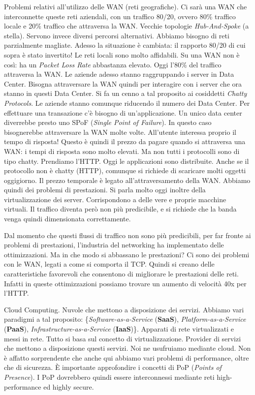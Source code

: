 Problemi relativi all'utilizzo delle WAN (reti geografiche). Ci sarà una WAN che interconnette queste reti aziendali, con un traffico 80/20, ovvero 80\% traffico locale e 20\% traffico che attraversa la WAN. Vecchie topologie \textit{Hub-And-Spoke} (a stella). Servono invece diversi percorsi alternativi. Abbiamo bisogno di reti parzialmente magliate. Adesso la situazione è cambiata: il rapporto 80/20 di cui sopra è stato invertito! Le reti locali sono molto affidabili. Su una WAN non è così: ha un \textit{Packet Loss Rate} abbastanza elevato. Oggi l'80\% del traffico attraversa la WAN. Le aziende adesso stanno raggruppando i server in Data Center. Bisogna attraversare la WAN quindi per interagire con i server che ora stanno in questi Data Center. Si fa un cenno a tal proposito ai cosiddetti \textit{Chatty Protocols}.
Le aziende stanno comunque riducendo il numero dei Data Center. Per effettuare una transazione c'è bisogno di un'applicazione. Un unico data center diverrebbe presto uno SPoF (\textit{Single Point of Failure}). In questo caso bisognerebbe attraversare la WAN molte volte. All'utente interessa proprio il tempo di risposta! Questo è quindi il prezzo da pagare quando si attraversa una WAN: i tempi di risposta sono molto elevati. Ma non tutti i protocolli sono di tipo chatty. Prendiamo l'HTTP. Oggi le applicazioni sono distribuite. Anche se il protocollo non è chatty (HTTP), comunque si richiede di scaricare molti oggetti oggigiorno. Il prezzo temporale è legato all'attraversamento della WAN. Abbiamo quindi dei problemi di prestazioni. Si parla molto oggi inoltre della virtualizzazione dei server. Corrispondono a delle vere e proprie macchine virtuali. Il traffico diventa però non più predicibile, e si richiede che la banda venga quindi dimensionata correttamente.

Dal momento che questi flussi di traffico non sono più predicibili, per far fronte ai problemi di prestazioni, l'industria del networking ha implementato delle ottimizzazioni. Ma in che modo si abbassano le prestazioni? Ci sono dei problemi con le WAN, legati a come si comporta il TCP. Quindi si creano delle caratteristiche favorevoli che consentono di migliorare le prestazioni delle reti. Infatti in queste ottimizzazioni possiamo trovare un aumento di velocità 40x per l'HTTP.

Cloud Computing. Nuvole che mettono a disposizione dei servizi. Abbiamo vari paradigmi a tal proposito: \{\textit{Software-as-a-Service} (\textbf{SaaS}), \textit{Platform-as-a-Service} (\textbf{PaaS}), \textit{Infrastructure-as-a-Service} (\textbf{IaaS})\}. Apparati di rete virtualizzati e messi in rete. Tutto si basa sul concetto di virtualizzazione. Provider di servizi che mettono a disposizione questi servizi. Noi ne usufruiamo mediante cloud. Non è affatto sorprendente che anche qui abbiamo vari problemi di performance, oltre che di sicurezza. \`E importante approfondire i concetti di PoP (\textit{Points of Presence}). I PoP dovrebbero quindi essere interconnessi mediante reti high-performance ed highly secure.

